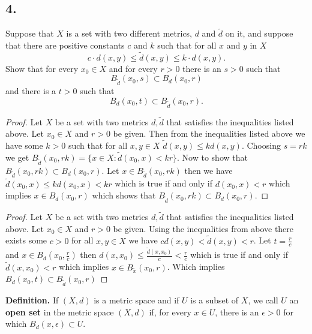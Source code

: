 \documentclass{amsart}
\theoremstyle{plain}
\theoremstyle{definition}
\theoremstyle{remark}
\begin{document}
\vspace{.15in}

\noindent
\subsection*{4.} Suppose that $X$ is a set with two different metrics, $d$ and $\widetilde{d}$ on it, and suppose that there are positive constants $c$ and $k$ such that for all $x$ and $y$ in $X$
\[
    c\cdot d(x,y) \le \widetilde{d} (x,y) \le k\cdot d(x,y).
\]
Show that for every $x_0\in X$ and for every $r > 0$ there is an $s > 0$ such that
\[
    B_{\widetilde{d}} (x_0, s) \subset B_d (x_0, r)
\]
and there is a $t >0$ such that
\[
    B_d (x_0, t) \subset B_{\widetilde{d}} (x_0, r).
\]

\vspace{.15in}

\begin{proof}
    Let $X$ be a set with two metrics $d,\tilde{d}$ that satisfies the inequalities listed above. Let $x_0\in X$ and $r>0$ be given. Then from the inequalities listed above we have some $k>0$ such that for all $x,y \in X$ $\tilde{d}(x,y)\leq kd(x,y)$. Choosing $s=rk$ we get $B_{\tilde{d}}(x_0,rk)=\{x\in X: \tilde{d}(x_0,x)< kr\}$. Now to show that $B_{\tilde{d}}(x_0,rk)\subset B_{d}(x_0,r)$. Let $x\in B_{\tilde{d}}(x_0,rk)$ then we have $\tilde{d}(x_0,x)\leq kd(x_0,x)<kr$ which is true if and only if $d(x_0,x)<r$ which implies $x\in B_d(x_0,r)$ which shows that $B_{\tilde{d}}(x_0,rk)\subset B_d(x_0,r)$.



\end{proof}

\begin{proof}
    Let $X$ be a set with two metrics $d,\tilde{d}$ that satisfies the inequalities listed above. Let $x_0\in X$ and $r>0$ be given. Using the inequalities from above there exists some $c>0$ for all $x,y\in X$ we have $cd(x,y)<\tilde{d}(x,y)<r$. Let $t=\frac{r}{c}$ and $x\in B_d(x_0,\frac{r}{c})$ then $d(x,x_0)\leq \frac{\tilde{d}(x,x_0)}{c}<\frac{r}{c}$ which is true if and only if $\tilde{d}(x,x_0)<r$ which implies $x\in B_{\tilde{x}}(x_0,r)$. Which implies $B_d(x_0,t)\subset B_{\tilde{d}}(x_0,r)$
\end{proof}

\noindent
{\bfseries Definition.} If $(X,d)$ is a metric space and if $U$ is a subset of $X$, we call $U$ an {\bfseries open set} in the metric space $(X,d)$ if, for every $x\in U$, there is an $\epsilon >0$ for which $B_d(x,\epsilon ) \subset U$.
\end{document}
